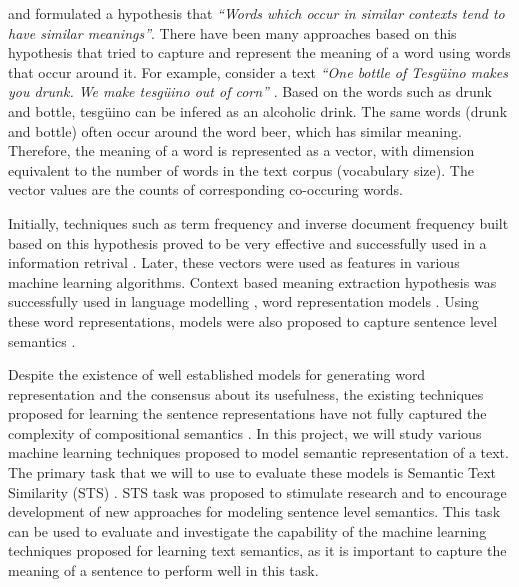 \documentclass[12pt]{report} %
\begin{document}
	
	 \cite{harris1970distributional} and \cite{firth1957synopsis} formulated a hypothesis that \textit{ \textquotedblleft Words which occur in similar contexts tend to have similar meanings\textquotedblright}. There have been many approaches based on this hypothesis that tried to capture and represent the meaning of a word using words that occur around it. For example, consider a text \textit{ \textquotedblleft One bottle of Tesgüino makes you drunk. We make tesgüino out of corn\textquotedblright} \citep{jurafsky2014speech}.  Based on the words such as drunk and bottle, tesgüino can be infered as an alcoholic drink. The same words (drunk and bottle) often occur around the word beer, which has similar meaning. Therefore, the meaning of a word is represented as a vector, with dimension equivalent to the number of words in the text corpus (vocabulary size). The vector values are the counts of corresponding co-occuring words.
	 
	 Initially, techniques such as term frequency and inverse document frequency built based on this hypothesis proved to be very effective and successfully used in a information retrival \citep{salton1971smart, deerwester1989computer}. 
	 Later, these vectors were used as features in various machine learning algorithms. Context based meaning extraction hypothesis was successfully used in language modelling \citep{bengio2003neural,collobert2008unified,collobert2011natural,mikolov2011extensions}, word representation models \citep{mikolov2014word2vec,pennington2014glove}. Using these word representations, models were also proposed to capture sentence level semantics  \citep{kiros2015skip,conneau2017supervised,shao2017hcti}. 	

	
	
	
	
 
	  
	Despite the existence of well established models for generating word representation and the consensus about its usefulness, the existing techniques proposed for learning the sentence representations have not fully captured the complexity of compositional semantics \citep{conneau2017supervised}. In this project, we will study various machine learning techniques proposed to model semantic representation of a text. The primary task that we will to use to evaluate these models is Semantic Text Similarity (STS) \citep{agirre2012semeval}. STS task was proposed to stimulate research and to encourage development of new approaches for modeling sentence level semantics. %
	This task can be used to evaluate and investigate the capability of the machine learning techniques proposed for learning text semantics, as it is important to capture the meaning of a sentence to perform well in this task.
	
\end{document}
